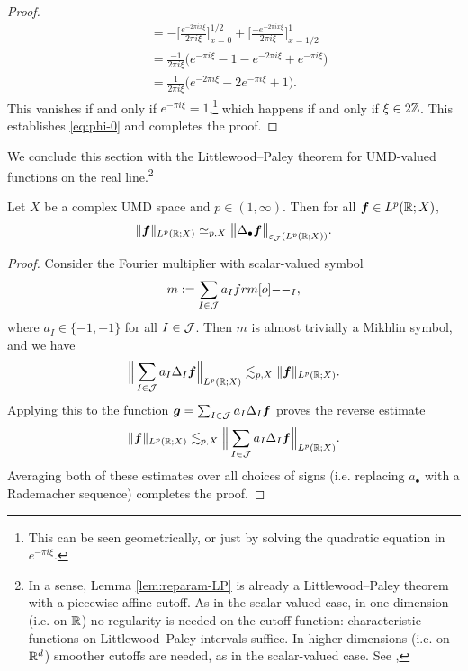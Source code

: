 \begin{proof}
\begin{equation*}
\begin{aligned}
     &= - \Big[ \frac{e^{-2\pi i x\xi}}{2\pi i \xi} \Big]_{x=0}^{1/2} + \Big[ \frac{-e^{-2\pi i x\xi}}{2\pi i \xi} \Big]_{x=1/2}^{1} \\
     &= \frac{-1}{2\pi i \xi} \Big( e^{-\pi i \xi} - 1 - e^{-2\pi i \xi} + e^{-\pi i \xi}\Big) \\
     &= \frac{1}{2\pi i \xi} \Big( e^{-2\pi i \xi} - 2e^{-\pi i \xi} + 1 \Big).
   \end{aligned}
 \end{equation*}
 This vanishes if and only if $e^{-\pi i \xi} = 1$,\footnote{This can be seen geometrically, or just by solving the quadratic equation in $e^{-\pi i \xi}$.} which happens if and only if $\xi \in 2\mathbb{Z}$.
 This establishes \eqref{eq:phi-0} and completes the proof.
\end{proof}

We conclude this section with the Littlewood--Paley theorem for UMD-valued functions on the real line.\footnote{In a sense, Lemma \ref{lem:reparam-LP} is already a Littlewood--Paley theorem with a piecewise affine cutoff. As in the scalar-valued case, in one dimension (i.e. on $\mathbb{R}$) no regularity is needed on the cutoff function: characteristic functions on Littlewood--Paley intervals suffice. In higher dimensions (i.e. on $\mathbb{R}^{d}$) smoother cutoffs are needed, as in the scalar-valued case. See \cite[Theorem 5.5.22]{HNVW16},}

\begin{thm}\label{thm:LittlewoodPaley}
  Let $X$ be a complex UMD space and $p \in (1,\infty)$.
  Then for all $\bm{f} \in L^p(\mathbb{R};X)$,
  \begin{equation*}
    \|\bm{f}\|_{L^p(\mathbb{R};X)} \simeq_{p,X} \big\| \Delta_{\bullet} \bm{f} \big\|_{\varepsilon_{\mathcal{J}}(L^p(\mathbb{R};X))}.
  \end{equation*}
\end{thm}

\begin{proof}
  Consider the Fourier multiplier with scalar-valued symbol
  \begin{equation*}
    m := \sum_{I \in \mc{J}} a_{I} \1_{I},
  \end{equation*}
  where $a_{I} \in \{-1,+1\}$ for all $I \in \mathcal{J}$.
  Then $m$ is almost trivially a Mikhlin symbol, and we have
  \begin{equation*}
    \Big\| \sum_{I \in \mathcal{J}} a_{I} \Delta_{I} \bm{f} \Big\|_{L^p(\mathbb{R};X)} \lesssim_{p,X} \|\bm{f}\|_{L^p(\mathbb{R};X)}.
  \end{equation*}
  Applying this to the function $\bm{g} = \sum_{I \in \mathcal{J}} a_{I} \Delta_{I} \bm{f}$ proves the reverse estimate
  \begin{equation*}
    \|\bm{f}\|_{L^p(\mathbb{R};X)} \lesssim_{p,X} \Big\| \sum_{I \in \mathcal{J}} a_{I} \Delta_{I} \bm{f} \Big\|_{L^p(\mathbb{R};X)}.
  \end{equation*}
  Averaging both of these estimates over all choices of signs (i.e. replacing $a_{\bullet}$ with a Rademacher sequence) completes the proof.
\end{proof}

